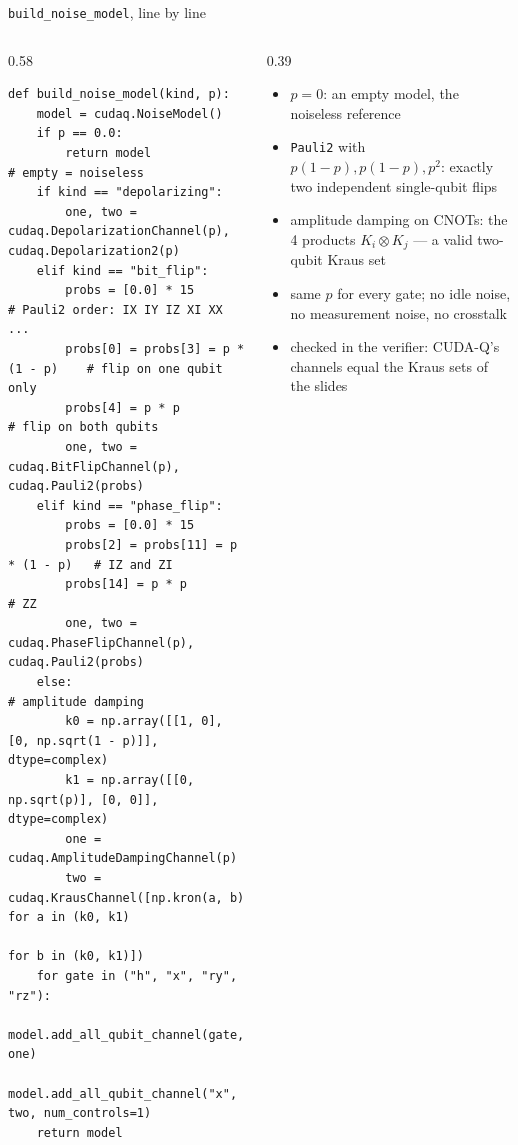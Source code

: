 \documentclass[aspectratio=169,11pt]{beamer}
\begin{document}
\begin{frame}[fragile,label=fModel]{\texttt{build\_noise\_model}, line by line}
  \begin{columns}[T]
    \begin{column}{0.58\textwidth}
\begin{lstlisting}[basicstyle=\ttfamily\tiny]
def build_noise_model(kind, p):
    model = cudaq.NoiseModel()
    if p == 0.0:
        return model                     # empty = noiseless
    if kind == "depolarizing":
        one, two = cudaq.DepolarizationChannel(p), cudaq.Depolarization2(p)
    elif kind == "bit_flip":
        probs = [0.0] * 15               # Pauli2 order: IX IY IZ XI XX ...
        probs[0] = probs[3] = p * (1 - p)    # flip on one qubit only
        probs[4] = p * p                     # flip on both qubits
        one, two = cudaq.BitFlipChannel(p), cudaq.Pauli2(probs)
    elif kind == "phase_flip":
        probs = [0.0] * 15
        probs[2] = probs[11] = p * (1 - p)   # IZ and ZI
        probs[14] = p * p                    # ZZ
        one, two = cudaq.PhaseFlipChannel(p), cudaq.Pauli2(probs)
    else:                                # amplitude damping
        k0 = np.array([[1, 0], [0, np.sqrt(1 - p)]], dtype=complex)
        k1 = np.array([[0, np.sqrt(p)], [0, 0]], dtype=complex)
        one = cudaq.AmplitudeDampingChannel(p)
        two = cudaq.KrausChannel([np.kron(a, b) for a in (k0, k1)
                                               for b in (k0, k1)])
    for gate in ("h", "x", "ry", "rz"):
        model.add_all_qubit_channel(gate, one)
    model.add_all_qubit_channel("x", two, num_controls=1)
    return model
\end{lstlisting}
    \end{column}
    \begin{column}{0.39\textwidth}
      \scriptsize
      \begin{itemize}\itemsep1pt
        \item $p = 0$: an empty model, the noiseless reference
        \item \texttt{Pauli2} with $p(1-p), p(1-p), p^2$: exactly two independent single-qubit flips
        \item amplitude damping on CNOTs: the 4 products $K_i\otimes K_j$ --- a valid two-qubit Kraus set
        \item same $p$ for every gate; no idle noise, no measurement noise, no crosstalk
        \item checked in the verifier: CUDA-Q's channels equal the Kraus sets of the slides
      \end{itemize}
    \end{column}
  \end{columns}
\end{frame}
\end{document}
